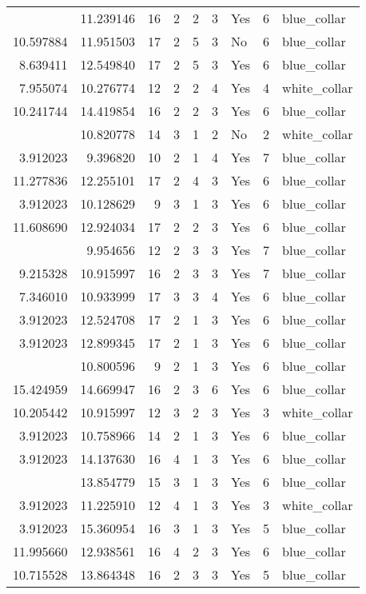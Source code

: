 \documentclass[
]{article}
\begin{document}
\begin{longtable}[t]{rrrrrllrl}
\addlinespace
5.521461 & 11.239146 & 16 & 2 & 2 & 3 & Yes & 6 & blue\_collar\\
10.597884 & 11.951503 & 17 & 2 & 5 & 3 & No & 6 & blue\_collar\\
8.639411 & 12.549840 & 17 & 2 & 5 & 3 & Yes & 6 & blue\_collar\\
7.955074 & 10.276774 & 12 & 2 & 2 & 4 & Yes & 4 & white\_collar\\
10.241744 & 14.419854 & 16 & 2 & 2 & 3 & Yes & 6 & blue\_collar\\
\addlinespace
3.912023 & 10.820778 & 14 & 3 & 1 & 2 & No & 2 & white\_collar\\
3.912023 & 9.396820 & 10 & 2 & 1 & 4 & Yes & 7 & blue\_collar\\
11.277836 & 12.255101 & 17 & 2 & 4 & 3 & Yes & 6 & blue\_collar\\
3.912023 & 10.128629 & 9 & 3 & 1 & 3 & Yes & 6 & blue\_collar\\
11.608690 & 12.924034 & 17 & 2 & 2 & 3 & Yes & 6 & blue\_collar\\
\addlinespace
6.309918 & 9.954656 & 12 & 2 & 3 & 3 & Yes & 7 & blue\_collar\\
9.215328 & 10.915997 & 16 & 2 & 3 & 3 & Yes & 7 & blue\_collar\\
7.346010 & 10.933999 & 17 & 3 & 3 & 4 & Yes & 6 & blue\_collar\\
3.912023 & 12.524708 & 17 & 2 & 1 & 3 & Yes & 6 & blue\_collar\\
3.912023 & 12.899345 & 17 & 2 & 1 & 3 & Yes & 6 & blue\_collar\\
\addlinespace
3.912023 & 10.800596 & 9 & 2 & 1 & 3 & Yes & 6 & blue\_collar\\
15.424959 & 14.669947 & 16 & 2 & 3 & 6 & Yes & 6 & blue\_collar\\
10.205442 & 10.915997 & 12 & 3 & 2 & 3 & Yes & 3 & white\_collar\\
3.912023 & 10.758966 & 14 & 2 & 1 & 3 & Yes & 6 & blue\_collar\\
3.912023 & 14.137630 & 16 & 4 & 1 & 3 & Yes & 6 & blue\_collar\\
\addlinespace
3.912023 & 13.854779 & 15 & 3 & 1 & 3 & Yes & 6 & blue\_collar\\
3.912023 & 11.225910 & 12 & 4 & 1 & 3 & Yes & 3 & white\_collar\\
3.912023 & 15.360954 & 16 & 3 & 1 & 3 & Yes & 5 & blue\_collar\\
11.995660 & 12.938561 & 16 & 4 & 2 & 3 & Yes & 6 & blue\_collar\\
10.715528 & 13.864348 & 16 & 2 & 3 & 3 & Yes & 5 & blue\_collar\\

\end{longtable}
\end{document}
